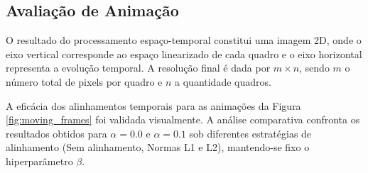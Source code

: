 \documentclass[12pt]{article}
\begin{document}
\FloatBarrier
\subsection{Avaliação de Animação}


O resultado do processamento espaço-temporal constitui uma imagem 2D, onde o eixo vertical corresponde ao espaço
linearizado de cada quadro e o eixo horizontal representa a evolução temporal. A resolução final é dada por
$m \times n$, sendo $m$ o número total de pixels por quadro e $n$ a quantidade quadros.

A eficácia dos alinhamentos temporais para as animações da Figura \ref{fig:moving_frames} foi validada visualmente.
A análise comparativa confronta os resultados obtidos para $\alpha = 0.0$ e $\alpha = 0.1$ sob diferentes estratégias
de alinhamento (Sem alinhamento, Normas L1 e L2), mantendo-se fixo o hiperparâmetro $\beta$.
\end{document}
